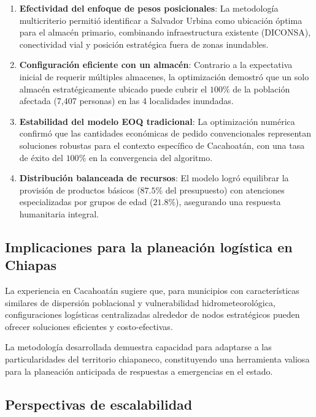 \documentclass[
  spanish,
  us-letterpaper,
]{scrreprt}
\numberwithin{equation}{chapter} %
\begin{document}
\begin{enumerate}
\def\labelenumi{\arabic{enumi}.}
\item
  \textbf{Efectividad del enfoque de pesos posicionales}: La metodología
  multicriterio permitió identificar a Salvador Urbina como ubicación
  óptima para el almacén primario, combinando infraestructura existente
  (DICONSA), conectividad vial y posición estratégica fuera de zonas
  inundables.
\item
  \textbf{Configuración eficiente con un almacén}: Contrario a la
  expectativa inicial de requerir múltiples almacenes, la optimización
  demostró que un solo almacén estratégicamente ubicado puede cubrir el
  \(100\%\) de la población afectada (7,407 personas) en las 4
  localidades inundadas.
\item
  \textbf{Estabilidad del modelo EOQ tradicional}: La optimización
  numérica confirmó que las cantidades económicas de pedido
  convencionales representan soluciones robustas para el contexto
  específico de Cacahoatán, con una tasa de éxito del \(100\%\) en la
  convergencia del algoritmo.
\item
  \textbf{Distribución balanceada de recursos}: El modelo logró
  equilibrar la provisión de productos básicos (\(87.5\%\) del
  presupuesto) con atenciones especializadas por grupos de edad
  (\(21.8\%\)), asegurando una respuesta humanitaria integral.
\end{enumerate}

\subsection{Implicaciones para la planeación logística en
Chiapas}\label{implicaciones-para-la-planeaciuxf3n-loguxedstica-en-chiapas}

La experiencia en Cacahoatán sugiere que, para municipios con
características similares de dispersión poblacional y vulnerabilidad
hidrometeorológica, configuraciones logísticas centralizadas alrededor
de nodos estratégicos pueden ofrecer soluciones eficientes y
costo-efectivas.

La metodología desarrollada demuestra capacidad para adaptarse a las
particularidades del territorio chiapaneco, constituyendo una
herramienta valiosa para la planeación anticipada de respuestas a
emergencias en el estado.

\subsection{Perspectivas de
escalabilidad}\label{perspectivas-de-escalabilidad}
\end{document}
